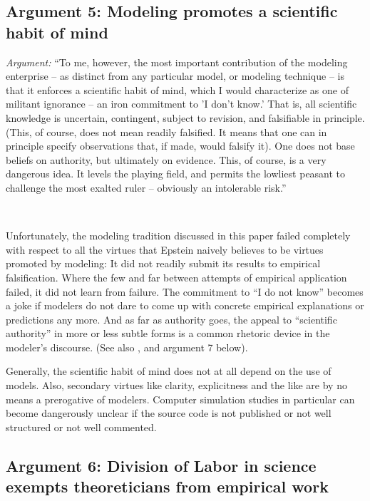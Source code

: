 \documentclass[graybox, English]{svmult}
\begin{document}
\subsection{Argument 5: Modeling promotes a scientific habit of mind}

{\em Argument:} ``To me, however, the most important contribution of
the modeling enterprise -- as distinct from any particular model, or
modeling technique -- is that it enforces a scientific habit of mind,
which I would characterize as one of militant ignorance -- an iron
commitment to 'I don't know.' That is, all scientific knowledge is
uncertain, contingent, subject to revision, and falsifiable in
principle. (This, of course, does not mean readily falsified. It means
that one can in principle specify observations that, if made, would
falsify it). One does not base beliefs on authority, but ultimately on
evidence. This, of course, is a very dangerous idea. It levels the
playing field, and permits the lowliest peasant to challenge the most
exalted ruler -- obviously an intolerable risk.''
\citep[1.16]{epstein:2008}

\

 Unfortunately, the modeling tradition
discussed in this paper failed completely with respect to all the
virtues that Epstein naively believes to be virtues promoted by
modeling: It did not readily submit its results to empirical
falsification. Where the few and far between attempts of empirical
application failed, it did not learn from failure. The commitment to
``I do not know'' becomes a joke if modelers do not dare to come up
with concrete empirical explanations or predictions any more. And as
far as authority goes, the appeal to ``scientific authority'' in
more or less subtle forms is a common rhetoric device in the modeler's
discourse. (See also \citet[157]{moses-knutsen:2012},
\citet[195]{green-shapiro:1994} and argument 7 below).

Generally, the scientific habit of mind does not at all depend on the
use of models. Also, secondary virtues like clarity, explicitness and
the like are by no means a prerogative of modelers. Computer
simulation studies in particular can become dangerously unclear if the
source code is not published or not well structured or not well commented.

\subsection{Argument 6: Division of Labor in science exempts theoreticians from empirical work} 
\end{document}
